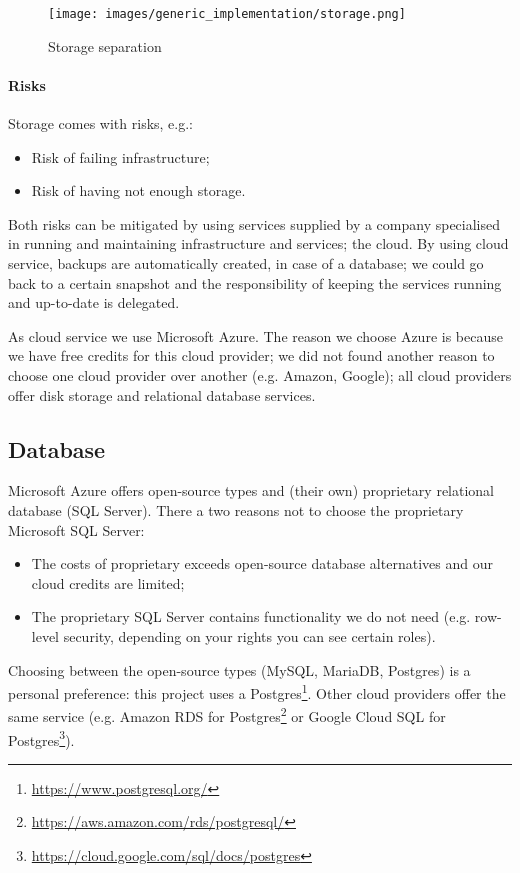 \documentclass{ou-report}
\begin{document}
\begin{figure}[H]
\centering
\texttt{[image: images/generic\_implementation/storage.png]}
\caption{Storage separation}
\label{fig:storage_separation}
\end{figure}

\newpage
\paragraph{Risks}
Storage comes with risks, e.g.:
\begin{itemize}
\item Risk of failing infrastructure;
\item Risk of having not enough storage.
\end{itemize}

Both risks can be mitigated by using services supplied by a
company specialised in running and maintaining infrastructure and services; 
the cloud. 
By using cloud service, backups are automatically created, in case of a database;
we could go back to a certain snapshot and the responsibility of keeping the 
services running and up-to-date is delegated. 

As cloud service we use Microsoft Azure. The reason we choose Azure is because we 
have free credits for this cloud provider; we did not found another reason to 
choose one cloud provider over another (e.g. Amazon, Google); all cloud 
providers offer disk storage and relational database services.

\subsection{Database}
Microsoft Azure offers open-source types and (their own) proprietary 
relational database (SQL Server). There a two reasons not to choose the 
proprietary Microsoft SQL Server:
\begin{itemize}
    \item The costs of proprietary exceeds open-source database alternatives and 
    our cloud credits are limited;
    \item The proprietary SQL Server contains functionality we do not need (e.g.
    row-level security, depending on your rights you can see certain roles).
\end{itemize}

Choosing between the open-source types (MySQL, MariaDB, Postgres) is a personal 
preference: this project uses a Postgres\footnote{\url{https://www.postgresql.org/}}. 
Other cloud providers offer the same service
(e.g. Amazon RDS for Postgres\footnote{\url{https://aws.amazon.com/rds/postgresql/}}
or Google Cloud SQL for 
Postgres\footnote{\url{https://cloud.google.com/sql/docs/postgres}}).
\end{document}

